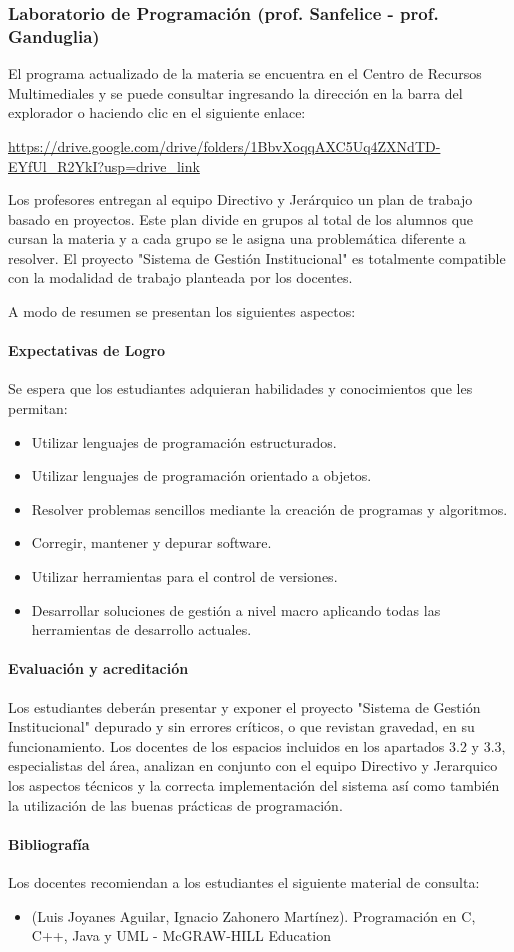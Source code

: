 \subsubsection{Laboratorio de Programación (prof. Sanfelice - prof. Ganduglia)}

El programa actualizado de la materia se encuentra en el Centro de Recursos Multimediales y se puede consultar ingresando la dirección en la barra del explorador o haciendo clic en el siguiente enlace:

\url{https://drive.google.com/drive/folders/1BbvXoqqAXC5Uq4ZXNdTD-EYfUl_R2YkI?usp=drive_link}

Los profesores entregan al equipo Directivo y Jerárquico un plan de trabajo basado en proyectos. Este plan divide en grupos al total de los alumnos que cursan la materia y a cada grupo se le asigna una problemática diferente a resolver. El proyecto "Sistema de Gestión Institucional" es totalmente compatible con la modalidad de trabajo planteada por los docentes.

A modo de resumen se presentan los siguientes aspectos:
\paragraph{Expectativas de Logro}
Se espera que los estudiantes adquieran habilidades y conocimientos que les permitan: 

\begin{itemize}
    \item Utilizar lenguajes de programación estructurados.
    \item Utilizar lenguajes de programación orientado a objetos.
    \item Resolver problemas sencillos mediante la creación de programas y algoritmos.
    \item Corregir, mantener y depurar software.
    \item Utilizar herramientas para el control de versiones.
    \item Desarrollar soluciones de gestión a nivel macro aplicando todas las herramientas de desarrollo actuales. 
\end{itemize}

\paragraph{Evaluación y acreditación}

Los estudiantes deberán presentar y exponer el proyecto "Sistema de Gestión Institucional" depurado y sin errores críticos, o que revistan gravedad, en su funcionamiento. Los docentes de los espacios incluidos en los apartados 3.2 y 3.3, especialistas del área, analizan en conjunto con el equipo Directivo y Jerarquico los aspectos técnicos y la correcta implementación del sistema así como también la utilización de las buenas prácticas de programación.

\paragraph{Bibliografía} Los docentes recomiendan a los estudiantes el siguiente material de consulta:
\begin{itemize}
    \item  (Luis Joyanes Aguilar, Ignacio Zahonero Martínez). Programación en C, C++, Java y UML - McGRAW-HILL Education

\end{itemize}
